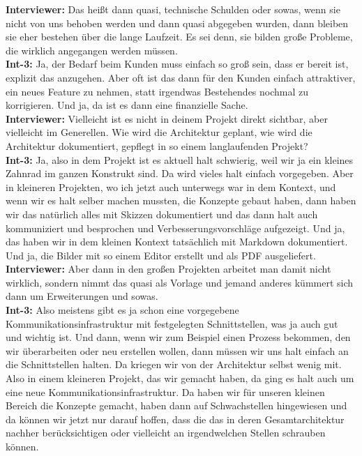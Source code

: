 \textbf{Interviewer:} Das heißt dann quasi, technische Schulden oder sowas, wenn sie nicht von uns behoben werden und dann quasi abgegeben wurden, dann bleiben sie eher bestehen über die lange Laufzeit. Es sei denn, sie bilden große Probleme, die wirklich angegangen werden müssen.\\
\textbf{Int-3:} Ja, der Bedarf beim Kunden muss einfach so groß sein, dass er bereit ist, explizit das anzugehen. Aber oft ist das dann für den Kunden einfach attraktiver, ein neues Feature zu nehmen, statt irgendwas Bestehendes nochmal zu korrigieren. Und ja, da ist es dann eine finanzielle Sache. \\
\textbf{Interviewer:} Vielleicht ist es nicht in deinem Projekt direkt sichtbar, aber vielleicht im Generellen. Wie wird die Architektur geplant, wie wird die Architektur dokumentiert, gepflegt in so einem langlaufenden Projekt? \\
\textbf{Int-3:} Ja, also in dem Projekt ist es aktuell halt schwierig, weil wir ja ein kleines Zahnrad im ganzen Konstrukt sind. Da wird vieles halt einfach vorgegeben. Aber in kleineren Projekten, wo ich jetzt auch unterwegs war in dem Kontext, und wenn wir es halt selber machen mussten, die Konzepte gebaut haben, dann haben wir das natürlich alles mit Skizzen dokumentiert und das dann halt auch kommuniziert und besprochen und Verbesserungsvorschläge aufgezeigt. Und ja, das haben wir in dem kleinen Kontext tatsächlich mit Markdown dokumentiert. Und ja, die Bilder mit so einem Editor erstellt und als PDF ausgeliefert. \\
\textbf{Interviewer:} Aber dann in den großen Projekten arbeitet man damit nicht wirklich, sondern nimmt das quasi als Vorlage und jemand anderes kümmert sich dann um Erweiterungen und sowas.\\
\textbf{Int-3:} Also meistens gibt es ja schon eine vorgegebene Kommunikationsinfrastruktur mit festgelegten Schnittstellen, was ja auch gut und wichtig ist. Und dann, wenn wir zum Beispiel einen Prozess bekommen, den wir überarbeiten oder neu erstellen wollen, dann müssen wir uns halt einfach an die Schnittstellen halten. Da kriegen wir von der Architektur selbst wenig mit. Also in einem kleineren Projekt, das wir gemacht haben, da ging es halt auch um eine neue Kommunikationsinfrastruktur. Da haben wir für unseren kleinen Bereich die Konzepte gemacht, haben dann auf Schwachstellen hingewiesen und da können wir jetzt nur darauf hoffen, dass die das in deren Gesamtarchitektur nachher berücksichtigen oder vielleicht an irgendwelchen Stellen schrauben können.\\
